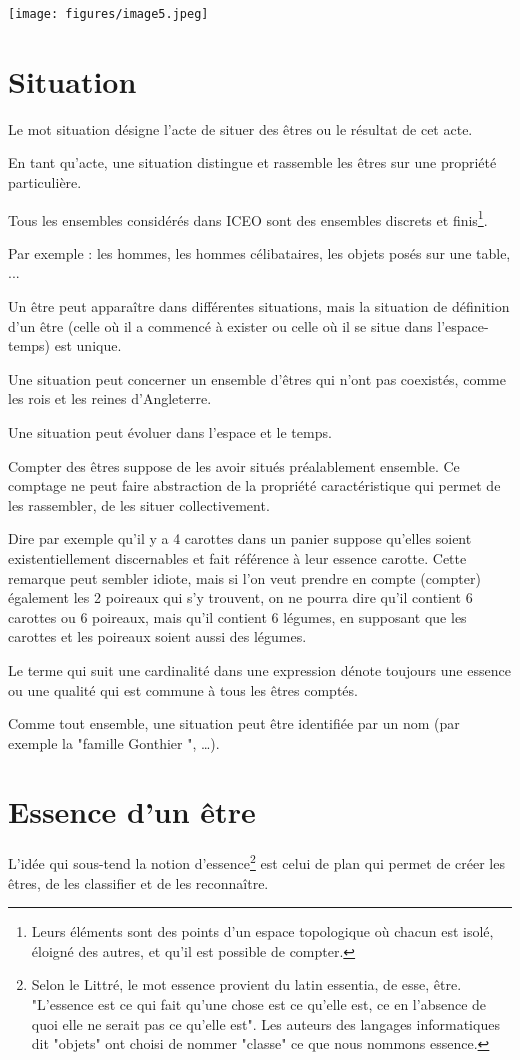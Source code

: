 \documentclass[a4paper, 12pt, openright, french]{book}
\begin{document}
\texttt{[image: figures/image5.jpeg]}



\section{Situation}

Le mot situation désigne l'acte de situer des êtres ou
le résultat de cet acte.

En tant qu'acte, une situation distingue et rassemble
les êtres sur une propriété particulière. 

Tous les ensembles considérés dans ICEO sont des ensembles discrets et finis\footnote{Leurs éléments sont des points d'un espace topologique où chacun est isolé, éloigné des autres, et qu'il est possible de compter.}.

Par exemple : les hommes, les hommes célibataires, les objets posés sur
une table, ...

Un être peut apparaître dans différentes situations, mais la situation
de définition d'un être (celle où il a commencé à
exister ou celle où il se situe dans l'espace-temps) est
unique.

Une situation peut concerner un ensemble d'êtres qui
n'ont pas coexistés, comme les rois et les reines
d'Angleterre.

Une situation peut évoluer dans l'espace et le temps.

Compter des êtres suppose de les avoir situés préalablement ensemble. Ce
comptage ne peut faire abstraction de la propriété caractéristique qui
permet de les rassembler, de les situer collectivement.

Dire par exemple qu'il y a 4 carottes dans un panier
suppose qu'elles soient existentiellement discernables
et fait référence à leur essence carotte. Cette remarque peut sembler
idiote, mais si l'on veut prendre en compte (compter)
également les 2 poireaux qui s'y trouvent, on ne pourra
dire qu'il contient 6 carottes ou 6 poireaux, mais
qu'il contient 6 légumes, en supposant que les carottes
et les poireaux soient aussi des légumes.

Le terme qui suit une cardinalité dans une expression dénote toujours
une essence ou une qualité qui est commune à tous les êtres comptés.

Comme tout ensemble, une situation peut être identifiée par un nom (par
exemple la "famille Gonthier ", \ldots).



\newpage
\section{Essence d'un être}
L'idée qui sous-tend la notion
d'essence\footnote{Selon le Littré, le mot essence provient du latin
	essentia, de esse, être. "L'essence est ce qui fait
	qu'une chose est ce qu'elle est, ce en
	l'absence de quoi elle ne serait pas ce
	qu'elle est". Les auteurs des langages informatiques dit
	"objets" ont choisi de nommer "classe" ce que nous nommons essence.} est celui de plan qui permet de créer les êtres, de les classifier et de les reconnaître.
\end{document}
